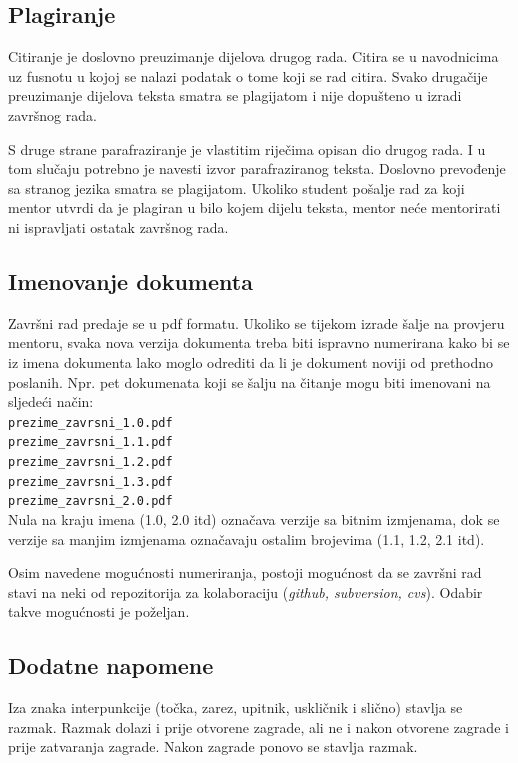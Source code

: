 \subsection{Plagiranje}

Citiranje je doslovno preuzimanje dijelova drugog rada. Citira se u navodnicima uz fusnotu u kojoj se nalazi podatak o tome koji se rad citira. 
Svako drugačije preuzimanje dijelova teksta 
smatra se plagijatom i nije dopušteno u izradi završnog rada. 

S druge strane parafraziranje je vlastitim riječima opisan dio drugog rada. 
I u tom slučaju potrebno je navesti izvor 
parafraziranog teksta. Doslovno prevođenje sa stranog jezika smatra se plagijatom. Ukoliko student pošalje rad za koji mentor utvrdi da je plagiran u bilo kojem dijelu teksta, mentor neće mentorirati ni ispravljati ostatak završnog rada. 

\subsection{Imenovanje dokumenta}

Završni rad predaje se u pdf formatu. Ukoliko se tijekom izrade šalje na provjeru mentoru, svaka nova verzija dokumenta treba biti 
ispravno numerirana kako bi se iz imena 
dokumenta lako moglo odrediti da li je dokument noviji od prethodno poslanih. Npr. pet dokumenata koji se šalju na čitanje mogu biti 
imenovani na sljedeći način:
\\
\texttt{prezime\_zavrsni\_1.0.pdf}\\
\texttt{prezime\_zavrsni\_1.1.pdf}\\
\texttt{prezime\_zavrsni\_1.2.pdf}\\
\texttt{prezime\_zavrsni\_1.3.pdf}\\
\texttt{prezime\_zavrsni\_2.0.pdf}\\
Nula na kraju imena (1.0, 2.0 itd) označava verzije sa bitnim izmjenama, dok se verzije sa manjim izmjenama označavaju ostalim brojevima (1.1, 1.2, 2.1 itd). 

Osim navedene mogućnosti numeriranja, postoji mogućnost da se završni rad stavi na neki od repozitorija za kolaboraciju (\textit{github, subversion, cvs}). Odabir takve mogućnosti je poželjan.

\subsection{Dodatne napomene}

Iza znaka interpunkcije (točka, zarez, upitnik, uskličnik i slično) stavlja se razmak. Razmak dolazi i prije otvorene zagrade, ali ne i nakon otvorene zagrade i prije zatvaranja zagrade. 
Nakon zagrade ponovo se stavlja razmak.

